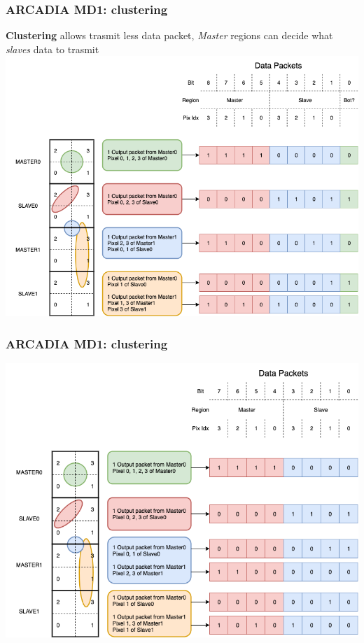     \begin{frame}[noframenumbering]
        \frametitle{ARCADIA MD1: clustering}
            \textbf{Clustering} allows trasmit less data packet, 
            \textit{Master} regions can decide what \textit{slaves} data to trasmit
            \includegraphics[width=.85\linewidth]{figures/ARCADIA/clustering.png}
    \end{frame}

    \begin{frame}[noframenumbering]
        \frametitle{ARCADIA MD1: clustering}
            \includegraphics[width=.9\linewidth]{figures/ARCADIA/nonclustering.png}
    \end{frame}
